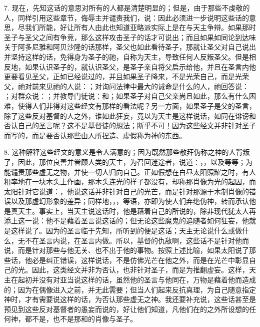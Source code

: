 7. 现在，先知这话的意思对所有的人都是清楚明显的；但是，由于那些不虔敬的人，同样引用这些章节，侮辱主并谴责我们，说：因此必须进一步说明这些话的意思，尽我们所能，好让所有人由此也知道亚略派实际上是在与天主争辩。如果那时圣子与圣父之间有争竞，那么这样攻击圣子的话才可说出；而且如果如同论到达味关于阿多尼雅和阿贝沙隆的话那样，圣父也如此看待圣子，那就让圣父对自己说出并坚持这样的话，免得身为圣子的祂，自称为天主，导致任何人反叛圣父。但是相反地，如果认识圣子的，就认识圣父，是圣子亲自将父启示给他，并且在圣言内他更要看见圣父，正如已经说过的，并且如果圣子降来，不是光荣自己，而是光荣父，祂对前来见祂的人说：；对询问法律中最大的诫命是什么的人，祂回答说： ；对群众说：；并教导门徒说：和；如果圣子对自己父亲尚且如此，那么有什么困难，使得人们非得对这些经文有那样的看法呢？另一方面，如果圣子是父的圣言，除了这些反对基督的人之外，谁如此狂妄，竟以为天主是这样说话，如同在诽谤和否认自己的圣言呢？这不是基督徒的想法；断乎不可！因为这些经文并非针对圣子而写的，而是要否认那些由人所捏造、虚假称为神的东西。\par

8. 这种解释这些经文的意义是令人满意的；因为既然那些敬拜伪称之神的人背叛了，因此，那位良善并眷顾人类的天主，为召回迷途者，说道：，，以及等等；为能谴责那些虚无之物，并使一切人归向自己。正如假想在白昼太阳照耀之时，有人粗率地在一块木头上作画，那木头连光的样子都没有，却称那肖像为光的起因，而太阳针对它说道：，他说这话并非针对自己的光芒，而是针对那源于木制肖像的错误以及那虚幻形象的差异；同样地，，，等语，亦即为使人们弃绝伪神，转而承认他是真天主。事实上，当天主说这话时，他是藉着自己的所说的，除非现代犹太人再添上这一说：他不是藉着圣言说这话的；但无论这些魔鬼的追随者如何狂妄，他就是这样说了。因为的圣言临于先知，所听到的便是这话；天主无论说什么或做什么，无不在圣言内说，在圣言内做。所以，基督的仇敌啊，这些话不是针对他而说，而是针对那些与他无关、也不出于他的事物。按照上述比喻，如果太阳说了那些话，他必是纠正错误，这样说话，不是仿佛光芒在他之外，而是在光芒中彰显自己的光。因此，这类经文并非为否认，也非针对圣子，而是为推翻虚妄。这样，天主在起初并没有对亚当说这样的话，虽然他的圣言与他同在，万物是藉着他而造成的；因为在偶像进入之前，并无此需要；但当人们起来反抗真理，为自己随意指定神时，才有需要说这样的话，为否认那些虚无之神。我还要补充说，这些话甚至是预见到这些反对基督者的愚妄而说的，好让他们知道，凡他们在的之外所设想的任何神，都不是，也不是那和的肖像与圣子。\par

